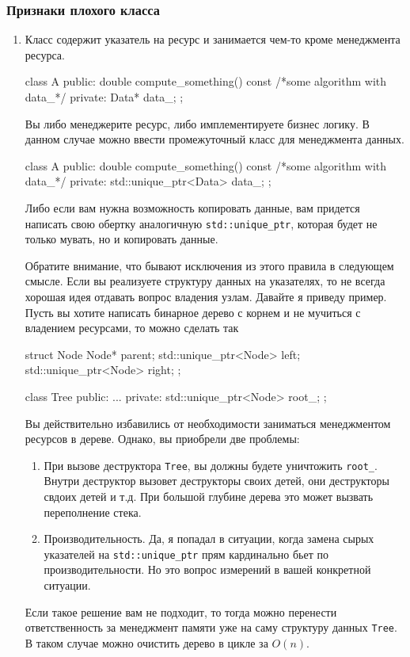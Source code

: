 \subsubsection{Признаки плохого класса}

\begin{enumerate}
\item Класс содержит указатель на ресурс и занимается чем-то кроме менеджмента ресурса.
\begin{cppcode}
class A {
public:
  double compute_something() const {
    /*some algorithm with data_*/
  }
private:
  Data* data_;
};
\end{cppcode}
Вы либо менеджерите ресурс, либо имплементируете бизнес логику.
В данном случае можно ввести промежуточный класс для менеджмента данных.
\begin{cppcode}
class A {
public:
  double compute_something() const {
    /*some algorithm with data_*/
  }
private:
  std::unique_ptr<Data> data_;
};
\end{cppcode}
Либо если вам нужна возможность копировать данные, вам придется написать свою обертку аналогичную \verb"std::unique_ptr", которая будет не только мувать, но и копировать данные.

Обратите внимание, что бывают исключения из этого правила в следующем смысле.
Если вы реализуете структуру данных на указателях, то не всегда хорошая идея отдавать вопрос владения узлам.
Давайте я приведу пример.
Пусть вы хотите написать бинарное дерево с корнем и не мучиться с владением ресурсами, то можно сделать так
\begin{cppcode}
struct Node {
  Node* parent;
  std::unique_ptr<Node> left;
  std::unique_ptr<Node> right;
};

class Tree {
public:
  ...
private:
  std::unique_ptr<Node> root_;
};
\end{cppcode}
Вы действительно избавились от необходимости заниматься менеджментом ресурсов в дереве.
Однако, вы приобрели две проблемы:
\begin{enumerate}
\item При вызове деструктора \verb"Tree", вы должны будете уничтожить \verb"root_".
Внутри деструктор вызовет деструкторы своих детей, они деструкторы свдоих детей и т.д.
При большой глубине дерева это может вызвать переполнение стека.

\item Производительность.
Да, я попадал в ситуации, когда замена сырых указателей на \verb"std::unique_ptr" прям кардинально бьет по производительности.
Но это вопрос измерений в вашей конкретной ситуации.
\end{enumerate}
Если такое решение вам не подходит, то тогда можно перенести ответственность за менеджмент памяти уже на саму структуру данных \verb"Tree".
В таком случае можно очистить дерево в цикле за $O(n)$.


\end{enumerate}
